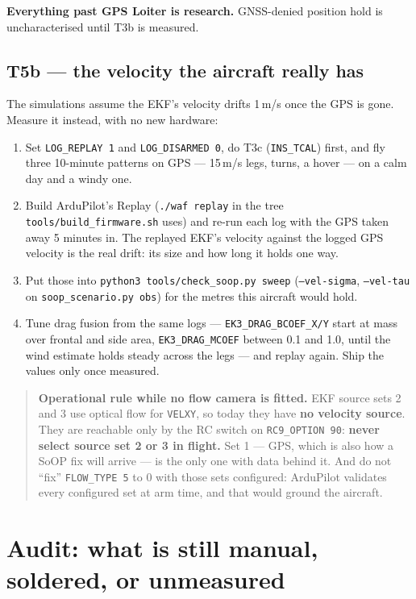 \documentclass[11pt,a4paper]{article}
\newcommand{\file}[1]{\texttt{\small #1}}
\newcommand{\cmd}[1]{\texttt{\small #1}}
\newcommand{\flag}[1]{\textcolor{warnred}{\textbf{#1}}}
\begin{document}
\textbf{Everything past GPS Loiter is research.} GNSS-denied position hold is
uncharacterised until T3b is measured.

\subsection{T5b --- the velocity the aircraft really has}

The simulations assume the EKF's velocity drifts 1\,m/s once the GPS is gone. Measure it
instead, with no new hardware:

\begin{enumerate}
\item Set \file{LOG\_REPLAY 1} and \file{LOG\_DISARMED 0}, do T3c (\file{INS\_TCAL}) first, and fly
three 10-minute patterns on GPS --- 15\,m/s legs, turns, a hover --- on a calm day and a windy one.
\item Build ArduPilot's Replay (\cmd{./waf replay} in the tree \file{tools/build\_firmware.sh}
uses) and re-run each log with the GPS taken away 5 minutes in. The replayed EKF's velocity
against the logged GPS velocity is the real drift: its size and how long it holds one way.
\item Put those into \cmd{python3 tools/check\_soop.py sweep} (\file{--vel-sigma},
\file{--vel-tau} on \file{soop\_scenario.py obs}) for the metres this aircraft would hold.
\item Tune drag fusion from the same logs --- \file{EK3\_DRAG\_BCOEF\_X/Y} start at mass over frontal
and side area, \file{EK3\_DRAG\_MCOEF} between 0.1 and 1.0, until the wind estimate holds steady
across the legs --- and replay again. Ship the values only once measured.
\end{enumerate}

\begin{quote}
\flag{Operational rule while no flow camera is fitted.} EKF source sets 2 and 3 use optical
flow for \file{VELXY}, so today they have \textbf{no velocity source}. They are reachable
only by the RC switch on \file{RC9\_OPTION 90}: \textbf{never select source set 2 or 3 in
flight.} Set 1 --- GPS, which is also how a SoOP fix will arrive --- is the only one with
data behind it. And do not ``fix'' \file{FLOW\_TYPE 5} to 0 with those sets configured:
ArduPilot validates every configured set at arm time, and that would ground the aircraft.
\end{quote}

\section{Audit: what is still manual, soldered, or unmeasured}
\end{document}
